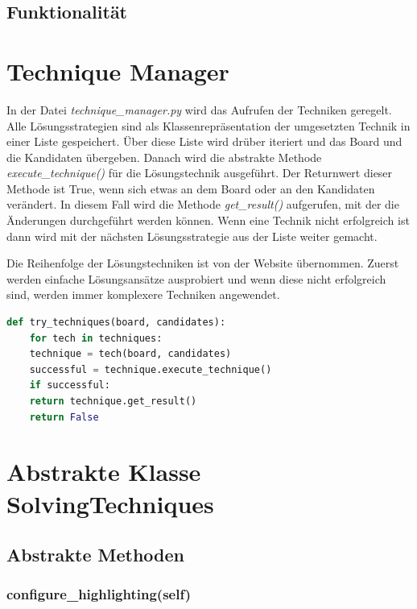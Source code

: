 \subsection{Funktionalität}



\section{Technique Manager}
In der Datei \textit{technique\_manager.py} wird das Aufrufen der Techniken geregelt. Alle Lösungsstrategien sind als Klassenrepräsentation der umgesetzten Technik in einer Liste gespeichert. Über diese Liste wird drüber iteriert und das Board und die Kandidaten übergeben. Danach wird die abstrakte Methode \textit{execute\_technique()} für die Lösungstechnik ausgeführt. Der Returnwert dieser Methode ist True, wenn sich etwas an dem Board oder an den Kandidaten verändert. In diesem Fall wird die Methode \textit{get\_result()} aufgerufen, mit der die Änderungen durchgeführt werden können.
Wenn eine Technik nicht erfolgreich ist dann wird mit der nächsten Lösungsstrategie aus der Liste weiter gemacht. 

Die Reihenfolge der Lösungstechniken ist von der Website \cite{martin} übernommen. Zuerst werden einfache Lösungsansätze ausprobiert und wenn diese nicht erfolgreich sind, werden immer komplexere Techniken angewendet.

\begin{lstlisting}[language=Python, caption={Funktion um eine anwendbare Lösungstechnik zu finden}, label={lst:try}]
	def try_techniques(board, candidates):
	for tech in techniques:
	technique = tech(board, candidates)
	successful = technique.execute_technique()
	if successful:
	return technique.get_result()
	return False
\end{lstlisting}

\section{Abstrakte Klasse SolvingTechniques}

\subsection{Abstrakte Methoden}

\subsubsection{configure\_highlighting(self)}

